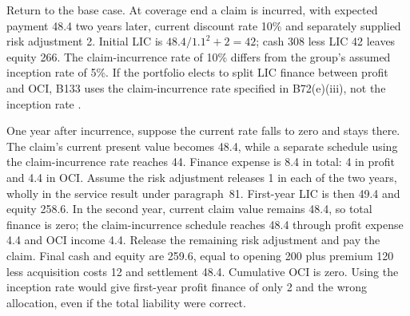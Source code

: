 Return to the base case. At coverage end a claim is incurred, with expected
payment 48.4 two years later, current discount rate 10\% and separately
supplied risk adjustment 2. Initial LIC is \(48.4/1.1^2+2=42\);
cash 308 less LIC 42 leaves equity 266. The claim-incurrence rate of 10\%
differs from the group's assumed inception rate of 5\%. If the portfolio
elects to split LIC finance between profit and OCI, B133 uses the
claim-incurrence rate specified in B72(e)(iii), not the inception rate
\citep[IFRS~17.59(b),B72(e)(iii),B133]{eu20231803}.

One year after incurrence, suppose the current rate falls to zero and stays
there. The claim's current present value becomes 48.4, while a separate
schedule using the claim-incurrence rate reaches 44. Finance expense is
8.4 in total: 4 in profit and 4.4 in OCI. Assume the risk adjustment
releases 1 in each of the two years, wholly in the service result under
paragraph~81. First-year LIC is then 49.4 and equity 258.6. In the second
year, current claim value remains 48.4, so total finance is zero; the
claim-incurrence schedule reaches 48.4 through profit expense 4.4 and OCI
income 4.4. Release the remaining risk adjustment and pay the claim.
Final cash and equity are 259.6, equal to opening 200 plus premium 120
less acquisition costs 12 and settlement 48.4. Cumulative OCI is zero.
Using the inception rate would give first-year profit finance of only 2
and the wrong allocation, even if the total liability were correct.
